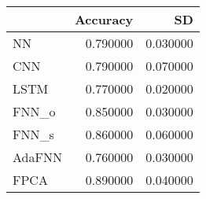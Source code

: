\begin{tabular}{lrr}
\toprule
 & Accuracy & SD \\
\midrule
NN & 0.790000 & 0.030000 \\
CNN & 0.790000 & 0.070000 \\
LSTM & 0.770000 & 0.020000 \\
FNN_o & 0.850000 & 0.030000 \\
FNN_s & 0.860000 & 0.060000 \\
AdaFNN & 0.760000 & 0.030000 \\
FPCA & 0.890000 & 0.040000 \\
\bottomrule
\end{tabular}

